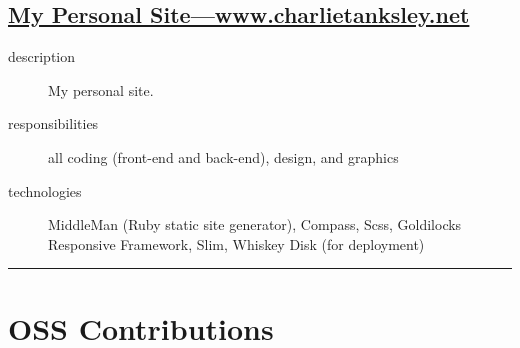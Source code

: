 \documentclass{article}
\begin{document}

\subsection{\href{http://www.charlietanksley.net}
  {My Personal Site---www.charlietanksley.net}}
\label{sub:My Personal Site}

\begin{multicols}{2}

\begin{description}
  \item[description] My personal site. 
  \item[responsibilities] all coding (front-end and back-end), design, and graphics 
  \item[technologies] MiddleMan (Ruby static site generator), Compass, Scss, Goldilocks Responsive Framework, Slim, Whiskey Disk (for deployment)
\end{description}

\vfill
\columnbreak
{}
\end{multicols}


\hrule
\section{OSS Contributions} %
\label{sec:OSS Contributions}
\end{document}
